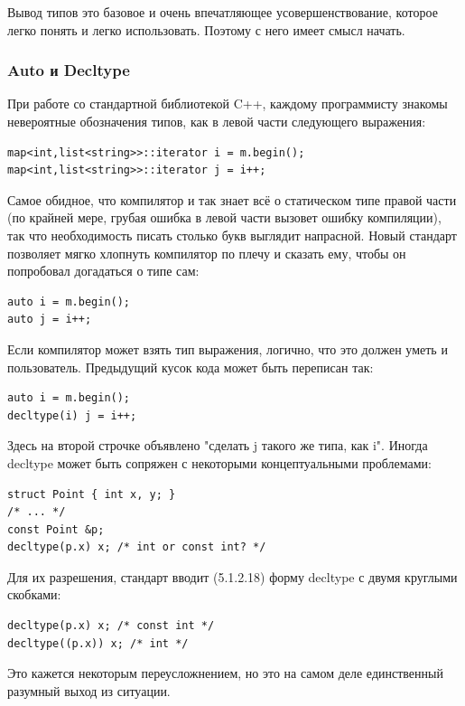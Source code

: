 \documentclass[a4paper,12pt,oneside]{article}
\begin{document}
Вывод типов это базовое и очень впечатляющее усовершенствование, которое легко понять и легко использовать. Поэтому с него имеет смысл начать.

\subsubsection{Auto и Decltype}

При работе со стандартной библиотекой C++, каждому программисту знакомы невероятные обозначения типов, как в левой части следующего выражения:

\begin{lstlisting}
map<int,list<string>>::iterator i = m.begin(); 
map<int,list<string>>::iterator j = i++; 
\end{lstlisting}

Самое обидное, что компилятор и так знает всё о статическом типе правой части (по крайней мере, грубая ошибка в левой части вызовет ошибку компиляции), так что необходимость писать столько букв выглядит напрасной. Новый стандарт позволяет мягко хлопнуть компилятор по плечу и сказать ему, чтобы он попробовал догадаться о типе сам:

\begin{lstlisting}
auto i = m.begin(); 
auto j = i++;
\end{lstlisting}

Если компилятор может взять тип выражения, логично, что это должен уметь и пользователь. Предыдущий кусок кода может быть переписан так:

\begin{lstlisting}
auto i = m.begin(); 
decltype(i) j = i++;
\end{lstlisting}

Здесь на второй строчке объявлено "сделать j такого же типа, как i". Иногда decltype может быть сопряжен с некоторыми концептуальными проблемами:

\begin{lstlisting}
struct Point { int x, y; }
/* ... */
const Point &p;
decltype(p.x) x; /* int or const int? */
\end{lstlisting}

Для их разрешения, стандарт вводит (5.1.2.18) форму decltype с двумя круглыми скобками:

\begin{lstlisting}
decltype(p.x) x; /* const int */
decltype((p.x)) x; /* int */
\end{lstlisting}

Это кажется некоторым переусложнением, но это на самом деле единственный разумный выход из ситуации.
\end{document}
